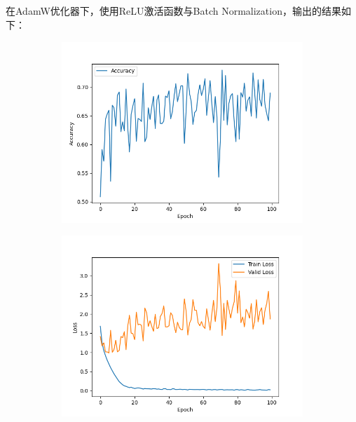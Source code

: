 \documentclass[11pt, a4paper]{article}
\begin{document}
\subsection{}
在AdamW优化器下，使用ReLU激活函数与Batch Normalization，输出的结果如下：
\begin{figure}[H]
    \hfill
    \begin{subfigure}[t]{0.45\linewidth}
        \includegraphics[width=\textwidth]{img/Q4/3/Acc.png}
    \end{subfigure}
    \hfill
    \begin{subfigure}[t]{0.45\linewidth}
        \includegraphics[width=\textwidth]{img/Q4/3/Loss.png}
    \end{subfigure}
    \hfill
\end{figure}
\end{document}
